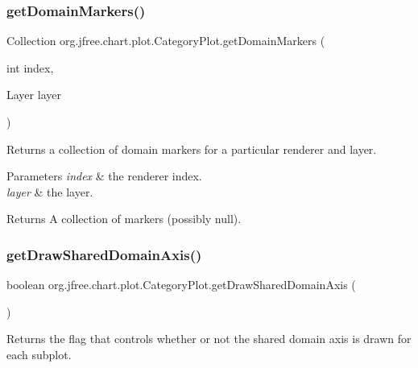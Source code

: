 \subsubsection{\texorpdfstring{get\+Domain\+Markers()}{getDomainMarkers()}\hspace{0.1cm}{\footnotesize\ttfamily [2/2]}}
{\footnotesize\ttfamily Collection org.\+jfree.\+chart.\+plot.\+Category\+Plot.\+get\+Domain\+Markers (\begin{DoxyParamCaption}\item[{int}]{index,  }\item[{Layer}]{layer }\end{DoxyParamCaption})}

Returns a collection of domain markers for a particular renderer and layer.


\begin{DoxyParams}{Parameters}
{\em index} & the renderer index. \\
\hline
{\em layer} & the layer.\\
\hline
\end{DoxyParams}
\begin{DoxyReturn}{Returns}
A collection of markers (possibly {\ttfamily null}). 
\end{DoxyReturn}
\mbox{\label{classorg_1_1jfree_1_1chart_1_1plot_1_1_category_plot_a9e0c506ed8f06c4136707ed8bc7febf2}} 
\subsubsection{\texorpdfstring{get\+Draw\+Shared\+Domain\+Axis()}{getDrawSharedDomainAxis()}}
{\footnotesize\ttfamily boolean org.\+jfree.\+chart.\+plot.\+Category\+Plot.\+get\+Draw\+Shared\+Domain\+Axis (\begin{DoxyParamCaption}{ }\end{DoxyParamCaption})}

Returns the flag that controls whether or not the shared domain axis is drawn for each subplot.

